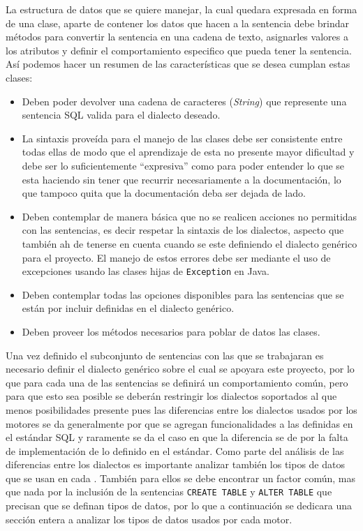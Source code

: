 La estructura de datos que se quiere manejar, la cual quedara expresada en forma de una clase, aparte de contener los datos que hacen a la sentencia debe brindar métodos para convertir la sentencia en una cadena de texto, asignarles valores a los atributos y definir el comportamiento especifico que pueda tener la sentencia. Así podemos hacer un resumen de las características que se desea cumplan estas clases:
\begin{itemize}
%
	\item Deben poder devolver una cadena de caracteres (\textit{String}) que represente una sentencia SQL valida para el dialecto deseado.
	\item La sintaxis proveída para el manejo de las clases debe ser consistente entre todas ellas de modo que el aprendizaje de esta no presente mayor dificultad y debe ser lo suficientemente ``expresiva'' como para poder entender lo que se esta haciendo sin tener que recurrir necesariamente a la documentación, lo que tampoco quita que la documentación deba ser dejada de lado. 
	\item Deben contemplar de manera básica que no se realicen acciones no permitidas con las sentencias, es decir respetar la sintaxis de los dialectos, aspecto que también ah de tenerse en cuenta cuando se este definiendo el dialecto genérico para el proyecto. El manejo de estos errores debe ser mediante el uso de excepciones usando las clases hijas de \verb=Exception= en Java.
	\item Deben contemplar todas las opciones disponibles para las sentencias que se están por incluir definidas en el dialecto genérico.
	\item Deben proveer los métodos necesarios para poblar de datos las clases.
%
\end{itemize}
%
Una vez definido el subconjunto de sentencias con las que se trabajaran es necesario definir el dialecto genérico sobre el cual se apoyara este proyecto, por lo que para cada una de las sentencias se definirá un comportamiento común, pero para que esto sea posible se deberán restringir los dialectos soportados al que menos posibilidades presente pues las diferencias entre los dialectos usados por los motores se da generalmente por que se agregan funcionalidades a las definidas en el estándar  SQL y raramente se da el caso en que la diferencia se de por la falta de implementación de lo definido en el estándar. Como parte del análisis de las diferencias entre los dialectos es importante analizar también los tipos de datos que se usan en cada \dd. También para ellos se debe encontrar un factor común, mas que nada por la inclusión de la sentencias \verb=CREATE TABLE= y \verb=ALTER TABLE= que precisan que se definan tipos de datos, por lo que a continuación se dedicara una sección entera a analizar los tipos de datos usados por cada motor.
%
%
